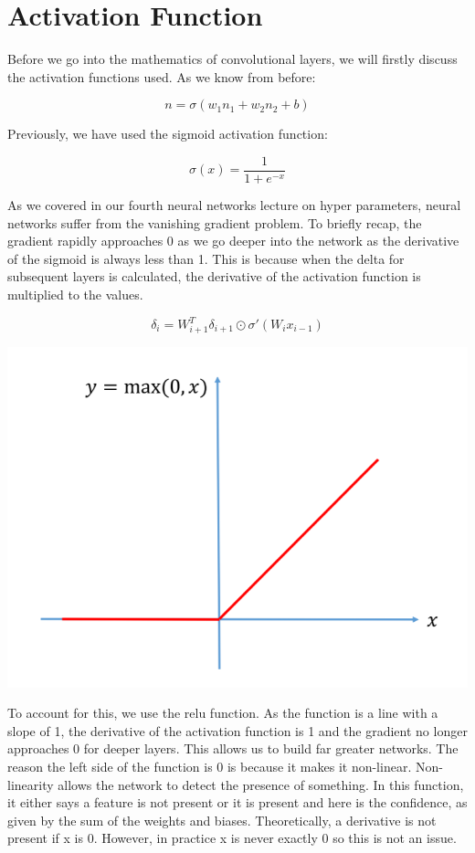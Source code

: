\documentclass{exam}
\begin{document}
\section{Activation Function}
Before we go into the mathematics of convolutional layers, we will firstly discuss the activation functions used. As we know from before:

$$n = \sigma(w_1n_1 + w_2n_2 + b)$$

Previously, we have used the sigmoid activation function:

$$\sigma(x) = \frac{1}{1 + e^{-x}}$$

As we covered in our fourth neural networks lecture on hyper parameters, neural networks suffer from the vanishing gradient problem. To briefly recap, the gradient rapidly approaches 0 as we go deeper into the network as the derivative of the sigmoid is always less than 1. This is because when the delta for subsequent layers is calculated, the derivative of the activation function is multiplied to the values.

$$\delta_i = W_{i+1}^T\delta_{i+1} \odot \sigma'(W_ix_{i-1})$$

\begin{center}
\includegraphics[scale=0.7]{relu.PNG}
\end{center}

To account for this, we use the relu function. As the function is a line with a slope of 1, the derivative of the activation function is 1 and the gradient no longer approaches 0 for deeper layers. This allows us to build far greater networks. The reason the left side of the function is 0 is because it makes it non-linear. Non-linearity allows the network to detect the presence of something. In this function, it either says a feature is not present or it is present and here is the confidence, as given by the sum of the weights and biases. Theoretically, a derivative is not present if x is 0. However, in practice x is never exactly 0 so this is not an issue.
\end{document}
